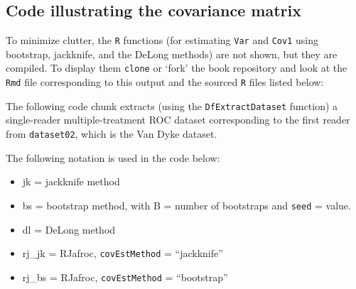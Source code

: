 \documentclass[
]{book}
\newenvironment{Shaded}{\begin{snugshade}}{\end{snugshade}}
\newcommand{\CommentTok}[1]{\textcolor[rgb]{0.56,0.35,0.01}{\textit{#1}}}
\newcommand{\DataTypeTok}[1]{\textcolor[rgb]{0.13,0.29,0.53}{#1}}
\newcommand{\DecValTok}[1]{\textcolor[rgb]{0.00,0.00,0.81}{#1}}
\newcommand{\KeywordTok}[1]{\textcolor[rgb]{0.13,0.29,0.53}{\textbf{#1}}}
\newcommand{\NormalTok}[1]{#1}
\newcommand{\OperatorTok}[1]{\textcolor[rgb]{0.81,0.36,0.00}{\textbf{#1}}}
\newcommand{\StringTok}[1]{\textcolor[rgb]{0.31,0.60,0.02}{#1}}
\providecommand{\tightlist}{%
  \setlength{\itemsep}{0pt}\setlength{\parskip}{0pt}}
\begin{document}
\hypertarget{or-method-intro-elementary-stats-code-cov-matrix}{%
\subsection{Code illustrating the covariance matrix}\label{or-method-intro-elementary-stats-code-cov-matrix}}

To minimize clutter, the \texttt{R} functions (for estimating \texttt{Var} and \texttt{Cov1} using bootstrap, jackknife, and the DeLong methods) are not shown, but they are compiled. To display them \texttt{clone} or `fork' the book repository and look at the \texttt{Rmd} file corresponding to this output and the sourced \texttt{R} files listed below:

The following code chunk extracts (using the \texttt{DfExtractDataset} function) a single-reader multiple-treatment ROC dataset corresponding to the first reader from \texttt{dataset02}, which is the Van Dyke dataset.

\begin{Shaded}
\end{Shaded}

The following notation is used in the code below:

\begin{itemize}
\tightlist
\item
  jk = jackknife method
\item
  bs = bootstrap method, with B = number of bootstraps and \texttt{seed} = value.
\item
  dl = DeLong method
\item
  rj\_jk = RJafroc, \texttt{covEstMethod} = ``jackknife''
\item
  rj\_bs = RJafroc, \texttt{covEstMethod} = ``bootstrap''
\end{itemize}
\end{document}
